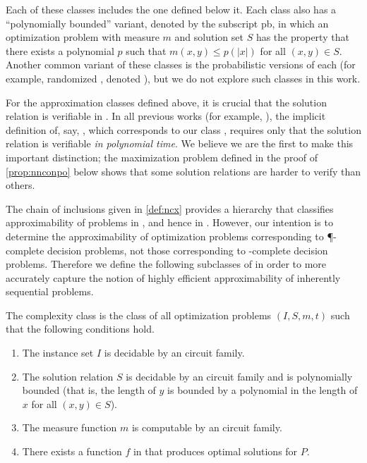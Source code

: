 \documentclass[]{article}
\newcommand{\pb}{\textsf{pb}}
\begin{document}
Each of these classes includes the one defined below it.
Each class also has a ``polynomially bounded'' variant, denoted by the subscript \pb, in which an optimization problem with measure $m$ and solution set $S$ has the property that there exists a polynomial $p$ such that $m(x, y) \leq p(|x|)$ for all $(x, y)\in S$.
Another common variant of these classes is the probabilistic versions of each (for example, randomized \NCAS{}, denoted \RNCAS), but we do not explore such classes in this work.

For the \NC{} approximation classes defined above, it is crucial that the solution relation is verifiable in \NC{}.
In all previous works (for example, \cite{dsst97, sx95}), the implicit definition of, say, \NCX{}, which corresponds to our class \ApxNCO, requires only that the solution relation is verifiable \emph{in polynomial time}.
We believe we are the first to make this important distinction; the maximization problem defined in the proof of \autoref{prop:nnconpo} below shows that some solution relations are harder to verify than others.

The chain of inclusions given in \autoref{def:ncx} provides a hierarchy that classifies approximability of problems in \NNCO{}, and hence in \NPO.
However, our intention is to determine the approximability of optimization problems corresponding to \P-complete decision problems, not those corresponding to \NP-complete decision problems.
Therefore we define the following subclasses of \PO{} in order to more accurately capture the notion of highly efficient approximability of inherently sequential problems.

\begin{definition}\label{def:poprime}
  The complexity class \POp{} is the class of all optimization problems $(I, S, m, t)$ such that the following conditions hold.
  \begin{enumerate}
  \item The instance set $I$ is decidable by an \NC{} circuit family.
  \item The solution relation $S$ is decidable by an \NC{} circuit family and is polynomially bounded (that is, the length of $y$ is bounded by a polynomial in the length of $x$ for all $(x, y)\in S$).
  \item The measure function $m$ is computable by an \FNC{} circuit family.
  \item There exists a function $f$ in \FP{} that produces optimal solutions for $P$.
  \end{enumerate}
\end{definition}
\end{document}
